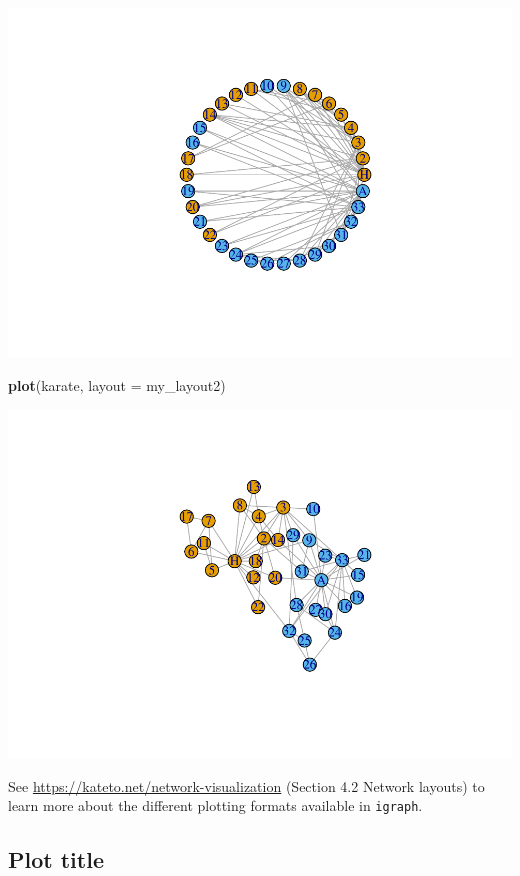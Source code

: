\documentclass[
]{book}
\newenvironment{Shaded}{\begin{snugshade}}{\end{snugshade}}
\newcommand{\AttributeTok}[1]{\textcolor[rgb]{0.13,0.29,0.53}{#1}}
\newcommand{\FunctionTok}[1]{\textcolor[rgb]{0.13,0.29,0.53}{\textbf{#1}}}
\newcommand{\NormalTok}[1]{#1}
\begin{document}
\includegraphics{bookdown-demo_files/figure-latex/unnamed-chunk-187-1.pdf}

\begin{Shaded}
\begin{Highlighting}[]
\FunctionTok{plot}\NormalTok{(karate, }\AttributeTok{layout =}\NormalTok{ my\_layout2)}
\end{Highlighting}
\end{Shaded}

\includegraphics{bookdown-demo_files/figure-latex/unnamed-chunk-187-2.pdf}

See \url{https://kateto.net/network-visualization} (Section 4.2 Network layouts) to learn more about the different plotting formats available in \texttt{igraph}.

\subsection{Plot title}\label{plot-title}
\end{document}
